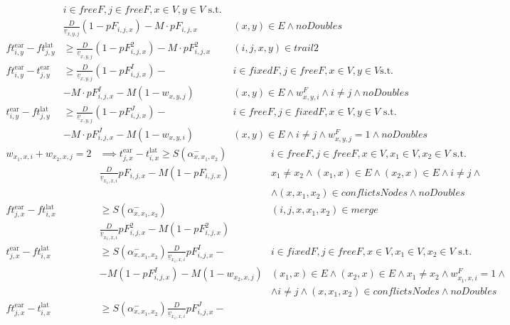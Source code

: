 \documentclass[../thesis.tex]{subfiles}
\begin{document}
{\begin{align}
& i\in freeF,j \in freeF,x\in V, y \in V\text{ s.t. }\nonumber\\
& \frac D{\underline v_{x,y,j}} (1-pF_{i,j,x}) - M \cdot pF_{i,j,x}
& (x,y)\in E\land noDoubles\\
ft^\text{ear}_{i,y}-ft^\text{lat}_{j,y}&\geq \frac D {\underline v_{x,y,j}}(1-pF^2_{i,j,x}) - M\cdot pF^2_{i,j,x} & (i,j,x,y)\in trail2\\
ft^\text{ear}_{i,y}- t^\text{ear}_{j,y} &\geq \frac D{\underline v_{x,y,j}} (1-pF^I_{i,j,x}) - &
i \in fixedF,j\in freeF,x\in V,y\in V\text{s.t.}\nonumber\\&-M\cdot pF^I_{i,j,x} - M(1-w_{x,y,j})&
(x,y)\in E\land  w^F_{x,y,i}\land i\neq j\land noDoubles\\
t^\text{ear}_{i,y}-ft^\text{lat}_{j,y}&\geq \frac D{\underline v_{x,y,j}} (1-pF^J_{i,j,x}) - & i\in freeF,j \in fixedF,x\in V,y\in V\text{ s.t. }
\nonumber\\&
-M\cdot pF^J_{i,j,x} -M (1-w_{x,y,i})
& (x,y)\in E\land i\neq j\land w^F_{x,y,j}=1\land noDoubles
\end{align}
\begin{align}
w_{x_1,x,i} + w_{x_2,x,j} = 2&\implies t^\text{ear}_{j,x}- t^\text{lat}_{i,x}\geq S(\alpha^-_{x,x_1,x_2})&
i\in freeF,j\in freeF,x\in V, x_1\in V, x_2\in V\text { s.t. }
\nonumber\\
&\frac D {\underline v_{x_1,x,i}} pF_{i,j,x} -M(1-pF_{i,j,x})&
x_1\neq x_2 \land
(x_1,x)\in E\land (x_2,x)\in E \land i\neq j\land \nonumber\\&&\land  (x,x_1,x_2)\in conflictsNodes  \land  noDoubles\\
ft^\text{ear}_{j,x}- ft^\text{lat}_{i,x}&\geq S(\alpha^-_{x,x_1,x_2})&
(i,j,x,x_1,x_2)\in merge
\nonumber\\
&\frac D {\underline v_{x_1,x,i}} pF^2_{i,j,x} -M(1-pF^2_{i,j,x})\\
t^\text{ear}_{j,x}- ft^\text{lat}_{i,x}&\geq S(\alpha^-_{x,x_1,x_2})\frac D {\underline v_{x_1,x,i}} pF^I_{i,j,x}-&
i \in fixedF, j\in freeF, x\in V,x_1\in V,x_2\in V\text { s.t. }
\nonumber\\
&  -M(1-pF^I_{i,j,x}) - M(1-w_{x_2,x,j})&
(x_1,x)\in E\land (x_2,x)\in E\land x_1\neq x_2\land w^F_{x_1,x,i}=1\land\nonumber\\
&&\land i\neq j \land (x,x_1,x_2)\in conflictsNodes\land noDoubles\\
ft^\text{ear}_{j,x}- t^\text{lat}_{i,x}&\geq S(\alpha^-_{x,x_1,x_2}) \frac D {\underline v_{x_1,x,i}} pF^J_{i,j,x}-&

\end{align}}
\end{document}
